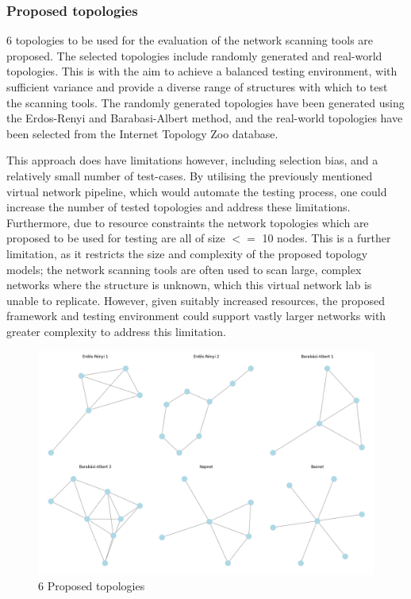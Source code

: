 \subsubsection{Proposed topologies}
6 topologies to be used for the evaluation of the network scanning tools are proposed. The selected topologies include randomly generated and real-world topologies. This is with the aim to achieve a balanced testing environment, with sufficient variance and provide a diverse range of structures with which to test the scanning tools. The randomly generated topologies have been generated using the Erdos-Renyi and Barabasi-Albert method, and the real-world topologies have been selected from the Internet Topology Zoo database. 

This approach does have limitations however, including selection bias, and a relatively small number of test-cases. By utilising the previously mentioned virtual network pipeline, which would automate the testing process, one could increase the number of tested topologies and address these limitations. Furthermore, due to resource constraints the network topologies which are proposed to be used for testing are all of size $<=$ 10 nodes. This is a further limitation, as it restricts the size and complexity of the proposed topology models; the network scanning tools are often used to scan large, complex networks where the structure is unknown, which this virtual network lab is unable to replicate. However, given suitably increased resources, the proposed framework and testing environment could support vastly larger networks with greater complexity to address this limitation. 

\begin{figure}
    \centering
    \includegraphics[width=0.7\linewidth]{images/final_6_graphs.png}
    \caption{6 Proposed topologies}
    \label{fig:6_prop_topo}
\end{figure}


